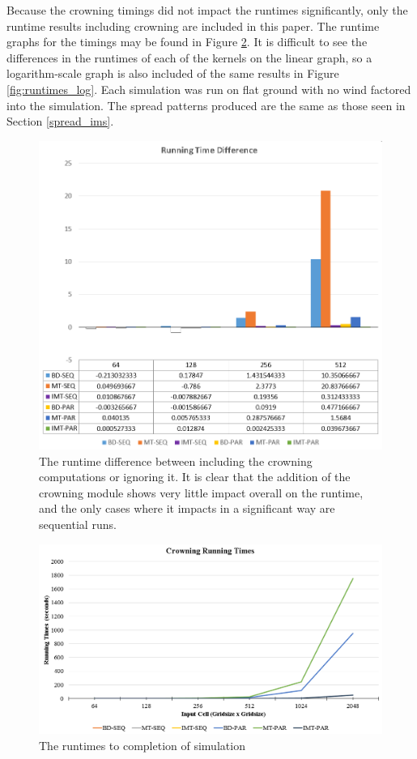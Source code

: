 Because the crowning timings did not impact the runtimes significantly, only the runtime results including crowning are included in this paper. The runtime graphs for the timings may be found in Figure \ref{fig:runtimes}. It is difficult to see the differences in the runtimes of each of the kernels on the linear graph, so a logarithm-scale graph is also included of the same results in Figure \ref{fig:runtimes_log}. Each simulation was run on flat ground with no wind factored into the simulation. The spread patterns produced are the same as those seen in Section \ref{spread_ims}. 
\begin{figure}[H]
\centering
  \includegraphics[width=\textwidth]{figures/results/runtime_diff.png}
  \caption{The runtime difference between including the crowning computations or ignoring it. It is clear that the addition of the crowning module shows very little impact overall on the runtime, and the only cases where it impacts in a significant way are sequential runs.}
  \label{fig:runtime_diff}
\end{figure}
\begin{figure}%
\centering
  \includegraphics[width=\textwidth]{figures/results/crowning_reg.png}
  \caption{The runtimes to completion of simulation }
  \label{fig:runtimes}
\end{figure}  
